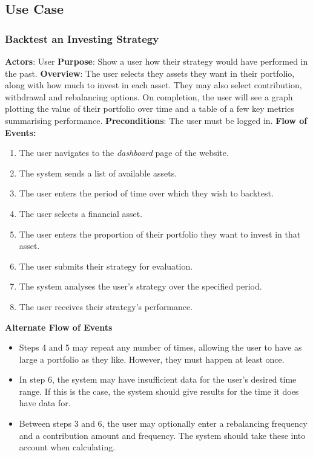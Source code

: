 \documentclass[main.tex]{subfiles}
\begin{document}
\subsection{Use Case}

\subsubsection{Backtest an Investing Strategy}

\textbf{Actors}: User
\newline
\newline
\textbf{Purpose}: Show a user how their strategy would have performed in the past.
\newline
\newline
\textbf{Overview}: The user selects they assets they want in their portfolio, along with how much to invest in each asset. They may also select contribution, withdrawal and rebalancing options. On completion, the user will see a graph plotting the value of their portfolio over time and a table of a few key metrics summarising performance.
\newline
\newline
\textbf{Preconditions}: The user must be logged in.
\newline
\newline
\textbf{Flow of Events:}
\newline
\begin{enumerate}
	\item The user navigates to the \textit{dashboard} page of the website.
	\item The system sends a list of available assets.
	\item The user enters the period of time over which they wish to backtest.
	\item The user selects a financial asset.
	\item The user enters the proportion of their portfolio they want to invest in that asset.
	\item The user submits their strategy for evaluation.
	\item The system analyses the user's strategy over the specified period.
	\item The user receives their strategy's performance.
\end{enumerate}
\textbf{Alternate Flow of Events}
\begin{itemize}
	\item Steps 4 and 5 may repeat any number of times, allowing the user to have as large a portfolio as they like. However, they must happen at least once.
	\item In step 6, the system may have insufficient data for the user's desired time range. If this is the case, the system should give results for the time it does have data for.
	\item Between steps 3 and 6, the user may optionally enter a rebalancing frequency and a contribution amount and frequency. The system should take these into account when calculating.
\end{itemize}
\end{document}
